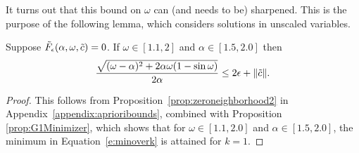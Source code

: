 It turns out that this bound on $\omega$ can (and needs to be) sharpened.
This is the purpose of the following lemma, 
which considers solutions in  unscaled variables. 
\begin{lemma}\label{lem:ZeroNBD}
Suppose $ \tilde{F}_\epsilon(\alpha,\omega,\tilde{c})=0$. If $\omega \in
[1.1,2]$ and $ \alpha \in [1.5,2.0]$  
then
\begin{equation}\label{e:tighterboundonomega}
   \frac{\sqrt{(\omega- \alpha)^2 + 2 \alpha \omega(1-\sin\omega)}}{2\alpha} 
   \leq 2 \epsilon + \| \tilde{c} \| .
\end{equation}
\end{lemma}
\begin{proof}
This follows from Proposition~\ref{prop:zeroneighborhood2} in
Appendix~\ref{appendix:aprioribounds}, combined with Proposition \ref{prop:G1Minimizer},  which shows that for
$\omega \in [1.1,2.0]$  and $ \alpha \in [1.5,2.0]$, the minimum in Equation~\eqref{e:minoverk} is attained for $k=1$.
\end{proof}

